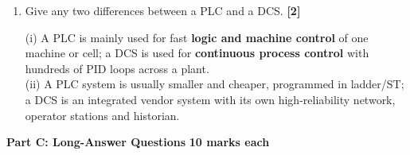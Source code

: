 \documentclass[11pt,a4paper]{article}
\newcommand{\qmarks}[1]{\hfill\textbf{[#1]}}
\newcommand{\partheading}[2]{%
	\bigskip
	\begin{tcolorbox}[colback=cAccent!10, colframe=cAccent, boxrule=0.6pt, arc=2pt, left=6pt, top=3pt, bottom=3pt]
		\textbf{\large #1} \hfill \textbf{#2}
	\end{tcolorbox}}
\begin{document}
\begin{enumerate}
		\item Give any two differences between a PLC and a DCS. \qmarks{2}
		\begin{answer}
			(i) A PLC is mainly used for fast \textbf{logic and machine control} of one machine or cell; a DCS is used for \textbf{continuous process control} with hundreds of PID loops across a plant.\\
			(ii) A PLC system is usually smaller and cheaper, programmed in ladder/ST; a DCS is an integrated vendor system with its own high-reliability network, operator stations and historian.
		\end{answer}

	\end{enumerate}

	\partheading{Part C: Long-Answer Questions}{10 marks each}
\end{document}
